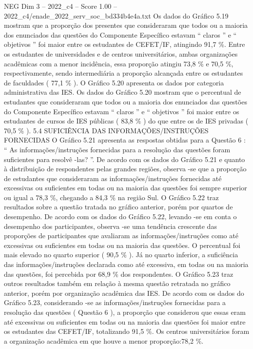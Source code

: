 \begin{textsample}{NEG Dim 3 – 2022\_c4 – Score 1.00 – 2022\_c4/enade\_2022\_serv\_soc\_bd334b4e4a.txt}
Os dados do Gráfico 5.19 mostram que a proporção dos presentes que consideraram que todos ou a maioria dos enunciados das questões do Componente Específico estavam “ claros ” e “ objetivos ” foi maior entre os estudantes de CEFET/IF, atingindo 91,7 \%.
Entre os estudantes de universidades e de centros universitários, ambas organizações acadêmicas com a menor incidência, essa proporção atingiu 73,8 \% e 70,5 \%, respectivamente, sendo intermediária a proporção alcançada entre os estudantes de faculdades ( 77,1 \% ).
O Gráfico 5.20 apresenta os dados por categoria administrativa das IES.
Os dados do Gráfico 5.20 mostram que o percentual de estudantes que consideraram que todos ou a maioria dos enunciados das questões do Componente Específico estavam “ claros ” e “ objetivos ” foi maior entre os estudantes de cursos de IES públicas ( 83,8 \% ) do que entre os de IES privadas ( 70,5 \% ). 5.4 SUFICIÊNCIA DAS INFORMAÇÕES/INSTRUÇÕES FORNECIDAS O Gráfico 5.21 apresenta as respostas obtidas para a Questão 6 : “ As informações/instruções fornecidas para a resolução das questões foram suficientes para resolvê -las? ”.
De acordo com os dados do Gráfico 5.21 e quanto à distribuição de respondentes pelas grandes regiões, observa -se que a proporção de estudantes que consideraram as informações/instruções fornecidas até excessivas ou suficientes em todas ou na maioria das questões foi sempre superior ou igual a 78,3 \%, chegando a 84,3 \% na região Sul.
O Gráfico 5.22 traz resultados sobre a questão tratada no gráfico anterior, porém por quartos de desempenho.
De acordo com os dados do Gráfico 5.22, levando -se em conta o desempenho dos participantes, observa -se uma tendência crescente das proporções de participantes que avaliaram as informações/instruções como até excessivas ou suficientes em todas ou na maioria das questões.
O percentual foi mais elevado no quarto superior ( 90,5 \% ).
Já no quarto inferior, a suficiência das informações/instruções declarada como até excessiva, em todas ou na maioria das questões, foi percebida por 68,9 \% dos respondentes.
O Gráfico 5.23 traz outros resultados também em relação à mesma questão retratada no gráfico anterior, porém por organização acadêmica das IES.
De acordo com os dados do Gráfico 5.23, considerando -se as informações/instruções fornecidas para a resolução das questões ( Questão 6 ), a proporção que considerou que essas eram até excessivas ou suficientes em todas ou na maioria das questões foi maior entre os estudantes das CEFET/IF, totalizando 91,5 \%.
Os centros universitários foram a organização acadêmica em que houve a menor proporção:78,2 \%.

\end{textsample}
